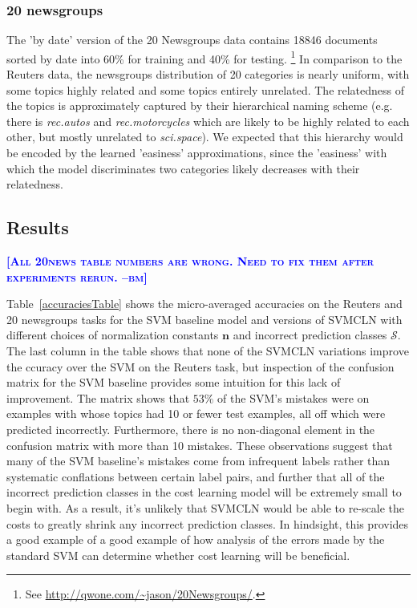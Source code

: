 \documentclass{article} %
\newcommand{\bmcomment}[1]{\textcolor{blue}{\textsc{\textbf{[#1 --bm]}}}}
\begin{document}
\subsubsection{20 newsgroups}

The 'by date' version of the 20 Newsgroups data contains 
18846 documents sorted by date into 60\% for training and 40\% for testing.  
\footnote{See \url{http://qwone.com/~jason/20Newsgroups/}.} In comparison
to the Reuters data, the newsgroups distribution of 20 categories is
nearly uniform, with some topics highly related and some topics entirely
unrelated.  The relatedness of the topics is approximately captured by
their hierarchical naming scheme (e.g. there is \textit{rec.autos} and
\textit{rec.motorcycles} which are likely to be highly related to each
other, but mostly unrelated to \textit{sci.space}).  We expected that
this hierarchy would be encoded by the learned 'easiness' approximations,
since the 'easiness' with which the model discriminates two categories
likely decreases with their relatedness.

\subsection{Results}

\bmcomment{All 20news table numbers are wrong.  Need to fix them after experiments rerun.}

Table~\ref{accuraciesTable} shows the micro-averaged
accuracies on the Reuters and 20 newsgroups tasks for the 
SVM baseline model and versions of SVMCLN with
different choices of normalization constants 
$\mathbf{n}$ and incorrect prediction classes $\mathcal{S}$.  The last column 
in the table shows that none of the SVMCLN variations improve the
 ccuracy over the SVM on the Reuters task, but inspection of the 
confusion matrix for the SVM
baseline provides some intuition for this lack of improvement.  
The matrix shows
that $53\%$ of the SVM's mistakes were on examples with whose topics had 10 or
fewer test examples, all off which were predicted incorrectly.  Furthermore,
there is no non-diagonal element in the confusion matrix with more than 10 
mistakes.  These observations suggest that many of the SVM baseline's mistakes
come from infrequent labels rather than systematic conflations between certain
label pairs, and further that all of the incorrect prediction classes in the
cost learning model will be extremely small to begin with.  As a result, it's
unlikely that SVMCLN would be able to re-scale the costs to greatly shrink
any incorrect prediction classes.  In hindsight, this provides a good example
of a good example of how analysis of the errors made by the standard SVM can
determine whether cost learning will be beneficial.
\end{document}
